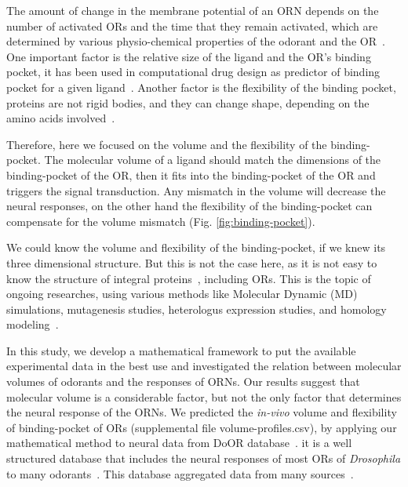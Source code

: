 \documentclass[11pt]{paper} %
\begin{document}
The amount of change in the membrane potential of an ORN depends on the number of activated ORs and the time that they remain activated,
which are determined by various physio-chemical properties of the odorant and the OR~\cite{Turin,Araneda2000,Gabler2013,guerrieri2005,uchida2000}.
One important factor is the relative size of the ligand and the OR's binding pocket, 
it has been used in computational drug design as predictor of binding pocket for a given ligand~\cite{liang1998anatomy,apostolakis1998docking,gunasekaran2007different}. 
Another factor is the flexibility of the binding pocket, 
proteins are not rigid bodies,  
and they can change shape, 
depending on the amino acids involved~\cite{Stereochemistry of polypeptide chain configurations GN Ramachandran}.

Therefore, here we focused on the volume and the flexibility of the binding-pocket.
The molecular volume of a ligand should match the dimensions of the binding-pocket of the OR,
then it fits into the binding-pocket of the OR and triggers the signal transduction. 
Any mismatch in the volume will decrease the neural responses, 
on the other hand the flexibility of the binding-pocket can compensate for the volume mismatch (Fig. \ref{fig:binding-pocket}).

We could know the volume and flexibility of the binding-pocket, 
if we knew its three dimensional structure. 
But this is not the case here, 
as it is not easy to know the structure of integral proteins~\cite{Zhang2008,Lupieri2009}, 
including ORs. 
This is the topic of ongoing researches, 
using various methods like Molecular Dynamic (MD) simulations, 
mutagenesis studies, heterologus expression studies, and homology modeling~\cite{Khafizov2007,Man2004,Lai2005,Vaidehi2002,Floriano2004,Schmiedeberg2007,Katada2005,Kato2008,Rospars2013}.

In this study, 
we develop a mathematical framework to put the available experimental data in the best use and
investigated the relation between molecular volumes of odorants and the responses of ORNs. 
Our results suggest that molecular volume is a considerable factor, 
but not the only factor that determines the neural response of the ORNs.
We predicted the {\it in-vivo} volume and flexibility of binding-pocket of ORs (supplemental file volume-profiles.csv), 
by applying our mathematical method to neural data from DoOR database~\cite{Galizia2010}. 
it is a well structured database that includes the neural responses of most ORs of \textit{Drosophila} to many odorants~\cite{Galizia2010}. 
This database aggregated data from many sources~\cite{Bruyne1999,Bruyne2001,Dobritsa2003,Goldman2005,Hallem2004,Hallem2006,
Kreher2005,Kreher2008,Kwon2007,Pelz2006,Pelz2006,Schmuker2007,Stensmyr2003,
Turner2009,VanderGoesvanNaters2007,Yao2005}.
\end{document}

